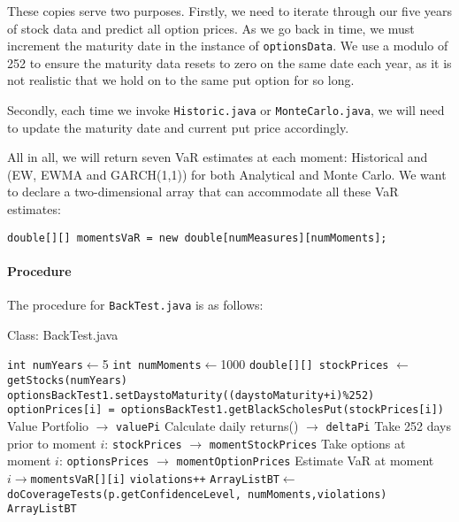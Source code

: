 \documentclass[../Dissertation.tex]{subfiles}
\begin{document}
These copies serve two purposes.
Firstly, we need to iterate through our five years of stock data and predict all option prices.
As we go back in time, we must increment the maturity date in the instance of \lstinline|optionsData|.
We use a modulo of 252 to ensure the maturity data resets to zero on the same date each year, as it is not realistic that we hold on to the same put option for so long.

Secondly, each time we invoke \lstinline|Historic.java| or \lstinline|MonteCarlo.java|, we will need to update the maturity date and current put price accordingly.

All in all, we will return seven VaR estimates at each moment: Historical and (EW, EWMA and GARCH(1,1)) for both Analytical and Monte Carlo.
We want to declare a two-dimensional array that can accommodate all these VaR estimates:
\begin{lstlisting}[firstnumber = 179]
double[][] momentsVaR = new double[numMeasures][numMoments];
\end{lstlisting}

\paragraph{Procedure}

The procedure for \lstinline|BackTest.java| is as follows:
					\begin{algorithm}
						\caption{Class: BackTest.java}
						\begin{algorithmic}[1]
						\label{class:BackTest}
						\State \lstinline|int numYears|$\gets$5	
						\State \lstinline|int numMoments|$\gets$1000
						\State \lstinline|double[][] stockPrices| $\gets$ \lstinline|getStocks(numYears)|	
               						\State \lstinline|optionsBackTest1.setDaystoMaturity((daystoMaturity+i)%252)|
               						\State \lstinline|optionPrices[i] = optionsBackTest1.getBlackScholesPut(stockPrices[i])|
							\State Value Portfolio $\to$ \lstinline|valuePi|
							\State Calculate daily returns() $\to$ \lstinline|deltaPi|
						\EndFor						
							\State Take 252 days prior to moment $i$: \lstinline|stockPrices| $\to$ \lstinline|momentStockPrices|
							\State Take options at moment $i$: \lstinline|optionsPrices| $\to$ \lstinline|momentOptionPrices|
							\State Estimate VaR at moment $i\to$\lstinline|momentsVaR[][i]|
							 {\lstinline|violations++|}
							\EndIf
						\EndFor
						\State \lstinline|ArrayListBT|$\gets$\lstinline|doCoverageTests(p.getConfidenceLevel, numMoments,violations)|
						\State \Return \lstinline|ArrayListBT|						
						\EndFunction
						\end{algorithmic}
					\end{algorithm}
\end{document}
